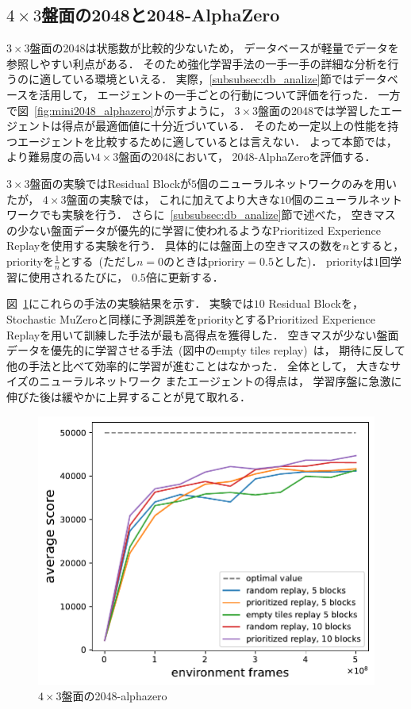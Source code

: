 \subsection{$4\times3$盤面の2048と2048-AlphaZero}
$3\times3$盤面の2048は状態数が比較的少ないため， データベースが軽量でデータを参照しやすい利点がある．
そのため強化学習手法の一手一手の詳細な分析を行うのに適している環境といえる．
実際，\ref{subsubsec:db_analize}節ではデータベースを活用して， エージェントの一手ごとの行動について評価を行った．
一方で図~\ref{fig:mini2048_alphazero}が示すように， $3\times3$盤面の2048では学習したエージェントは得点が最適価値に十分近づいている．
そのため一定以上の性能を持つエージェントを比較するために適しているとは言えない．
よって本節では， より難易度の高い$4\times3$盤面の2048において， 2048-AlphaZeroを評価する．

$3\times3$盤面の実験ではResidual Blockが$5$個のニューラルネットワークのみを用いたが， $4\times3$盤面の実験では， これに加えてより大きな$10$個のニューラルネットワークでも実験を行う．
さらに~\ref{subsubsec:db_analize}節で述べた， 空きマスの少ない盤面データが優先的に学習に使われるようなPrioritized Experience Replayを使用する実験を行う．
具体的には盤面上の空きマスの数を$n$とすると， priorityを$\frac{1}{n}$とする~(ただし$n=0$のときはprioriry$=0.5$とした)．
priorityは$1$回学習に使用されるたびに， $0.5$倍に更新する．

図~\ref{fig:mid2048_alphazero}にこれらの手法の実験結果を示す．
実験では$10$ Residual Blockを， Stochastic MuZeroと同様に予測誤差をpriorityとするPrioritized Experience Replayを用いて訓練した手法が最も高得点を獲得した．
空きマスが少ない盤面データを優先的に学習させる手法~(図中のempty tiles replay)~は， 期待に反して他の手法と比べて効率的に学習が進むことはなかった．
全体として， 大きなサイズのニューラルネットワーク
またエージェントの得点は， 学習序盤に急激に伸びた後は緩やかに上昇することが見て取れる．
\begin{figure}[t]
    \centering
    \includegraphics[width=0.6\linewidth{}]{figures/alphazero_4x3.pdf}
    \caption{$4\times3$盤面の2048-alphazero}
    \label{fig:mid2048_alphazero}
\end{figure}  


